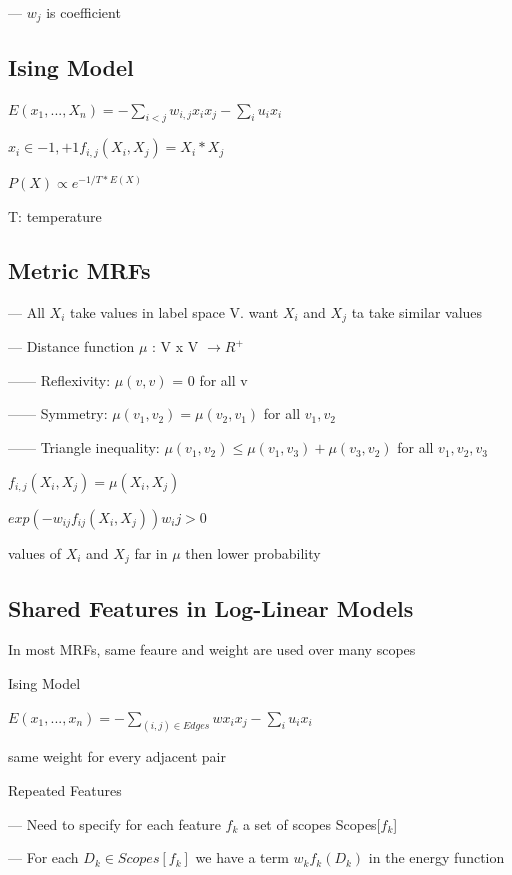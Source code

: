 \documentclass{book}
\begin{document}
--- $w_j$ is coefficient

\subsection{Ising Model}

$E(x_1,...,X_n) = - \sum_{i<j} w_{i,j}x_i x_j - \sum_i u_i x_i$

$x_i \in {-1,+1} f_{i,j}(X_i, X_j) = X_i * X_j $

$P(X) \propto e^{-1/T * E(X)} $

T: temperature 

\subsection{Metric MRFs}

--- All $X_i$ take values in label space V. want $X_i$ and $X_j$ ta take similar values

--- Distance function $\mu$ : V x V $ \rightarrow R^+$

------ Reflexivity: $\mu(v,v)$ = 0 for all v

------ Symmetry: $\mu(v_1,v_2) = \mu(v_2,v_1)$ for all $v_1, v_2$

------ Triangle inequality: $\mu(v_1,v_2) \leq \mu(v_1,v_3) + \mu(v_3,v_2)$ for all $v_1,v_2,v_3$

$f_{i,j}(X_i,X_j) = \mu(X_i,X_j) $

$exp(-w_{ij}f_{ij}(X_i,X_j)) w_ij > 0$

values of $X_i$ and $X_j$ far in $\mu$ then lower probability

\subsection{Shared Features in Log-Linear Models}
 In most MRFs, same feaure and weight are used over many scopes
 
 Ising Model
 
 $E(x_1,...,x_n) = - \sum_{(i,j) \in Edges} w x_i x_j - \sum_i u_i x_i$
 
 same weight for every adjacent pair
 
 Repeated Features
 
 --- Need to specify for each feature $f_k$ a set of scopes Scopes[$f_k$]
 
 --- For each $D_k \in Scopes[f_k]$ we have a term $w_kf_k(D_k)$ in the energy function
 
\end{document}
